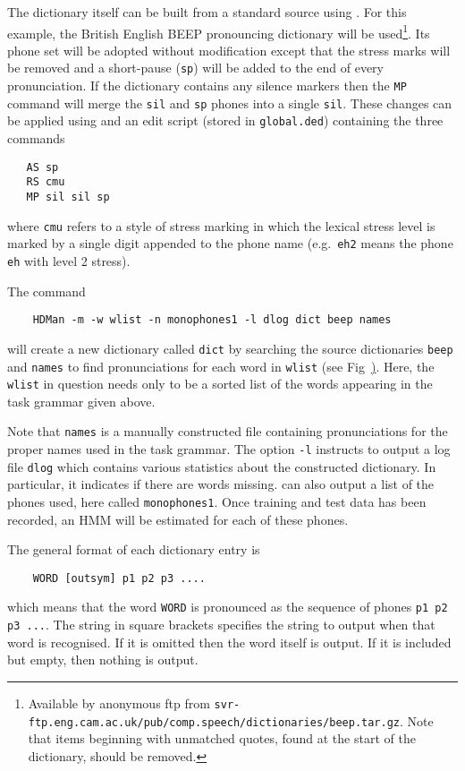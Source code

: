 The dictionary  
itself can be built from a standard source 
using .
For this example, the British English BEEP pronouncing dictionary will be
used\footnote{Available by anonymous ftp from 
\texttt{svr-ftp.eng.cam.ac.uk/pub/comp.speech/dictionaries/beep.tar.gz}.
Note that items beginning with unmatched quotes, found at the start
of the dictionary, should be removed.}.  
Its phone set will be adopted without modification except that 
the stress marks will be removed and a short-pause (\texttt{sp}) will
be added to the end of every pronunciation. If the dictionary contains any
silence markers then the \texttt{MP} command will merge the \texttt{sil} and 
\texttt{sp} phones into a single \texttt{sil}. These changes can be applied 
using  and an edit script (stored in \texttt{global.ded})
containing the three commands
\begin{verbatim}
   AS sp
   RS cmu
   MP sil sil sp
\end{verbatim}
where \texttt{cmu} refers to a style of stress marking in which 
the lexical stress level is
marked by a single digit appended to the phone name (e.g.\ \texttt{eh2} means
the phone \texttt{eh} with level 2 stress). 


\noindent
The command
\begin{verbatim}
    HDMan -m -w wlist -n monophones1 -l dlog dict beep names
\end{verbatim}
will create a new dictionary called \texttt{dict} by searching the source
dictionaries \texttt{beep} and \texttt{names} to find pronunciations for each
word in \texttt{wlist} (see Fig~\href{f:step2}). Here, the \texttt{wlist} in
question needs only to be a sorted list of the words appearing in the task
grammar given above.

Note that \texttt{names} is a manually constructed file containing
pronunciations for the proper names used in the task grammar. The option
\texttt{-l} instructs  to output a log file \texttt{dlog} which 
contains various statistics about the constructed dictionary. In particular,
it indicates if there are words missing.  can also output a list
of the phones used, here called \texttt{monophones1}. Once training and test
data has been recorded, an HMM will be estimated for each of these phones.

The general format of each dictionary entry is
\begin{verbatim}
    WORD [outsym] p1 p2 p3 ....
\end{verbatim}
which means that the word \texttt{WORD} is pronounced as the sequence of phones
\texttt{p1 p2 p3 ...}.  The string in square brackets specifies the string to
output when that word is recognised.  If it is omitted then the word itself is
output.  If it is included but empty, then nothing is output.

